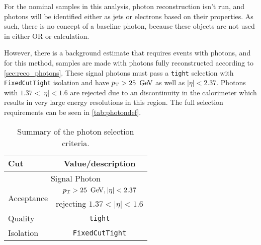 For the nominal samples in this analysis, photon reconstruction isn't run, and photons will be identified either as jets or electrons based on their properties. As such, there is no concept of a baseline photon, because these objects are not used in either \ac{OR} or \met calculation. 

However, there is a background estimate that requires events with photons, and for this method, samples are made with photons fully reconstructed according to \autoref{sec:reco_photons}. These signal photons must pass a \texttt{tight} selection with \texttt{FixedCutTight} isolation and have $\pt > 25\,\GeV$ as well as $|\eta| < 2.37$. Photons with $1.37<|\eta|<1.6$ are rejected due to an discontinuity in the calorimeter which results in very large energy resolutions in this region. The full selection requirements can be seen in \autoref{tab:photondef}.

\begin{table}[ph!]
  \begin{center}
    \begin{tabular}{l|c}
      \hline
      Cut            & Value/description \\
      \hline
      \hline
      \multicolumn{2}{c}{Signal Photon}\\
      \hline
      \multirow{2}{*}{Acceptance}     & $\pt > 25\,\GeV, |\eta| < 2.37$ \\
                     & rejecting $1.37<|\eta|<1.6$\\
      Quality        & \texttt{tight}    \\
      Isolation        & \texttt{FixedCutTight} \\
      \hline      
      \hline
    \end{tabular}
  \caption{Summary of the photon selection criteria.}            
    \label{tab:photondef}
  \end{center}
\end{table}

